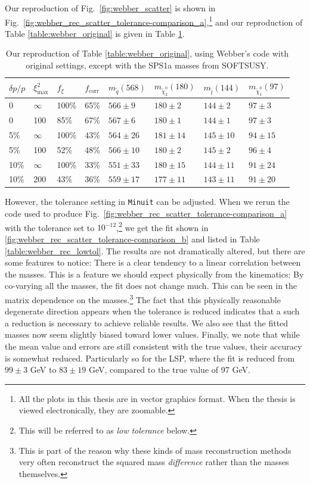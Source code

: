 \documentclass[twoside,english]{uiofysmaster}
\begin{document}
Our reproduction of Fig.\ \ref{fig:webber_scatter} is shown in Fig.\ \ref{fig:webber_rec_scatter_tolerance-comparison_a},\footnote{All the plots in this thesis are in vector graphics format. When the thesis is viewed electronically, they are zoomable.} and our reproduction of Table \ref{table:webber_original} is given in Table \ref{table:webber_softsusy}.
\begin{table}[hbt]
	\centering
	\begin{tabular}{| l | l | l | l  || l | l | l | l |}
		\hline
		$\delta p/p$ & $\xi^2_\mathrm{max}$ & $f_\xi$ & $f_\mathrm{corr}$ & $m_{\tilde q} (568)$ & $m_{\tilde \chi_2^0} (180)$ & $m_{\tilde l} (144)$ & $m_{\tilde \chi_1^0} (97)$ \\
		\hline \hline
		0 & 	$\infty$ &	100\%	& 65\%	& $566 \pm 9$	&	$180 \pm 2$		&	$144 \pm 2$	& 	$97 \pm 3$	\\
		0 &		100 &		85\%	& 67\% & $567 \pm 6$	&	$180 \pm 1$		&	$144 \pm 1$	&	$97 \pm 3$	\\
		5\% &	$\infty$ &	100\%	& 43\% & $564 \pm 26$	& 	$181 \pm 14$	&	$145 \pm 10$&	$94 \pm 15$ \\
		5\% &	100 &		52\%	& 48\% & $566 \pm 10$	&	$180 \pm 2$		& 	$145 \pm 2$	&	$96 \pm 4$	\\
		10\% &	$\infty$ &	100\%	& 33\% & $551 \pm 33$	&	$180 \pm 15$	&	$144 \pm 11$&	$91 \pm 24$	\\
			10\% &	200 &		43\%	& 36\% & $559 \pm 17$	& 	$177 \pm 11$	&	$143 \pm 11$&	$91 \pm 20$ \\
		\hline
	\end{tabular}
	\caption{Our reproduction of Table \ref{table:webber_original}, using Webber's code \cite{Webber:epost} with original settings, except with the SPS1a masses from SOFTSUSY.}
	\label{table:webber_softsusy}
\end{table}

However, the tolerance setting in {\tt Minuit} can be adjusted. When we rerun the code used to produce Fig.\ \ref{fig:webber_rec_scatter_tolerance-comparison_a} with the tolerance set to $10^{-12}$,\footnote{This will be referred to as {\it low tolerance} below.} we get the fit shown in \ref{fig:webber_rec_scatter_tolerance-comparison_b} and listed in Table \ref{table:webber_rec_lowtol}. The results are not dramatically altered, but there are some features to notice: There is a clear tendency to a linear correlation between the masses. This is a feature we should expect physically from the kinematics: By co-varying all the masses, the fit does not change much. This can be seen in the matrix dependence on the masses.\footnote{This is part of the reason why these kinds of mass reconstruction methods very often reconstruct the squared mass {\it difference} rather than the masses themselves.} The fact that this physically reasonable degenerate direction appears when the tolerance is reduced indicates that a such a reduction is necessary to achieve reliable results. We also see that the fitted masses now seem slightly biased toward lower values. Finally, we note that while the mean value and errors are still consistent with the true values, their accuracy is somewhat reduced. Particularly so for the LSP, where the fit is reduced from $99 \pm 3$ GeV to $83 \pm 19$ GeV, compared to the true value of 97 GeV.
\end{document}
